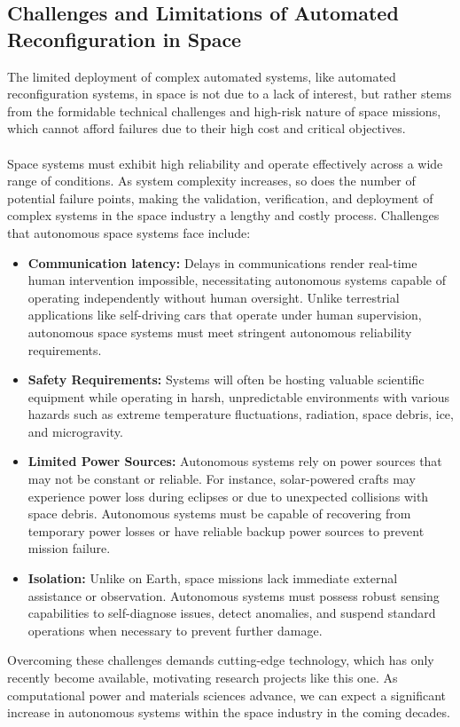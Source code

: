 \subsection{Challenges and Limitations of Automated Reconfiguration in Space}
The limited deployment of complex automated systems, like automated reconfiguration systems, in space is not due to a lack of interest, but rather stems from the formidable technical challenges and high-risk nature of space missions, which cannot afford failures due to their high cost and critical objectives.
\\\\
Space systems must exhibit high reliability and operate effectively across a wide range of conditions. As system complexity increases, so does the number of potential failure points, making the validation, verification, and deployment of complex systems in the space industry a lengthy and costly process. Challenges that autonomous space systems face include:
\\
\begin{itemize}[]
	\item \textbf{Communication latency:} Delays in communications render real-time human intervention impossible, necessitating autonomous systems capable of operating independently without human oversight. Unlike terrestrial applications like self-driving cars that operate under human supervision, autonomous space systems must meet stringent autonomous reliability requirements.
	\\
	\item \textbf{Safety Requirements:} Systems will often be hosting valuable scientific equipment while operating in harsh, unpredictable environments with various hazards such as extreme temperature fluctuations, radiation, space debris, ice, and microgravity.
	\\
	\item \textbf{Limited Power Sources:} Autonomous systems rely on power sources that may not be constant or reliable. For instance, solar-powered crafts may experience power loss during eclipses or due to unexpected collisions with space debris. Autonomous systems must be capable of recovering from temporary power losses or have reliable backup power sources to prevent mission failure.
	\\
	\item \textbf{Isolation:} Unlike on Earth, space missions lack immediate external assistance or observation. Autonomous systems must possess robust sensing capabilities to self-diagnose issues, detect anomalies, and suspend standard operations when necessary to prevent further damage.
	\\
\end{itemize}
Overcoming these challenges demands cutting-edge technology, which has only recently become available, motivating research projects like this one. As computational power and materials sciences advance, we can expect a significant increase in autonomous systems within the space industry in the coming decades.